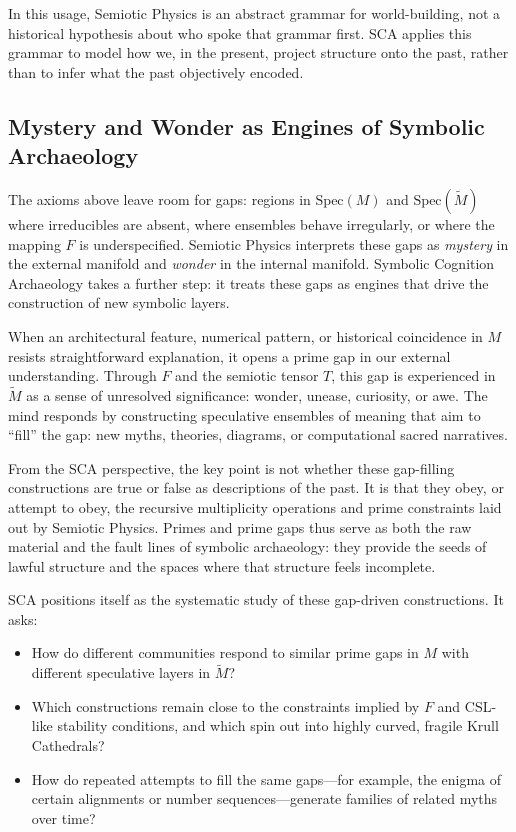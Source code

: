 \documentclass[12]{amsart}
\theoremstyle{plain}
\begin{document}
In this usage, Semiotic Physics is an abstract grammar for world-building, not a historical hypothesis about who spoke that grammar first. SCA applies this grammar to model how we, in the present, project structure onto the past, rather than to infer what the past objectively encoded.

\subsection{Mystery and Wonder as Engines of Symbolic Archaeology}

The axioms above leave room for gaps: regions in $\mathrm{Spec}(M)$ and $\mathrm{Spec}(\tilde M)$ where irreducibles are absent, where ensembles behave irregularly, or where the mapping $F$ is underspecified. Semiotic Physics interprets these gaps as \emph{mystery} in the external manifold and \emph{wonder} in the internal manifold. Symbolic Cognition Archaeology takes a further step: it treats these gaps as engines that drive the construction of new symbolic layers.

When an architectural feature, numerical pattern, or historical coincidence in $M$ resists straightforward explanation, it opens a prime gap in our external understanding. Through $F$ and the semiotic tensor $T$, this gap is experienced in $\tilde M$ as a sense of unresolved significance: wonder, unease, curiosity, or awe. The mind responds by constructing speculative ensembles of meaning that aim to ``fill'' the gap: new myths, theories, diagrams, or computational sacred narratives.

From the SCA perspective, the key point is not whether these gap-filling constructions are true or false as descriptions of the past. It is that they obey, or attempt to obey, the recursive multiplicity operations and prime constraints laid out by Semiotic Physics. Primes and prime gaps thus serve as both the raw material and the fault lines of symbolic archaeology: they provide the seeds of lawful structure and the spaces where that structure feels incomplete.

SCA positions itself as the systematic study of these gap-driven constructions. It asks:

\begin{itemize}
  \item How do different communities respond to similar prime gaps in $M$ with different speculative layers in $\tilde M$?
  \item Which constructions remain close to the constraints implied by $F$ and CSL-like stability conditions, and which spin out into highly curved, fragile Krull Cathedrals?
  \item How do repeated attempts to fill the same gaps---for example, the enigma of certain alignments or number sequences---generate families of related myths over time?
\end{itemize}
\end{document}
